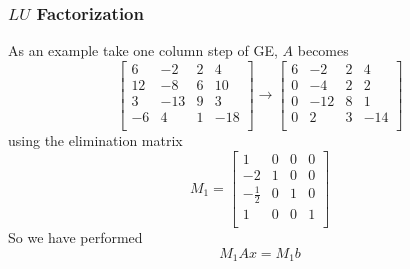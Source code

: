 \documentclass[10pt]{beamer}
\begin{document}
\begin{frame}
\frametitle{$LU$ Factorization}
As an example take one column step of GE, $A$ becomes
\begin{equation*}
    \begin{bmatrix}
    6 & -2 & 2 & 4\\
    12 & -8 & 6 & 10\\
    3 & -13 & 9 & 3\\
    -6 & 4 & 1 & -18\\
    \end{bmatrix}
    \rightarrow
    \begin{bmatrix}
    6 & -2 & 2 & 4\\
    0 & -4 & 2 & 2\\
    0 & -12 & 8 & 1\\
    0 & 2 & 3 & -14\\
    \end{bmatrix}
\end{equation*}
using the elimination matrix
\begin{equation*}
    M_1 = 
    \begin{bmatrix}
    1 & 0 & 0 & 0\\
    -2 & 1 & 0 & 0\\
    -\frac{1}{2} & 0 & 1 & 0\\
    1 & 0 & 0 & 1\\
    \end{bmatrix}
\end{equation*}
So we have performed
\[
M_1 A x = M_1 b
\]
\end{frame}
\end{document}
